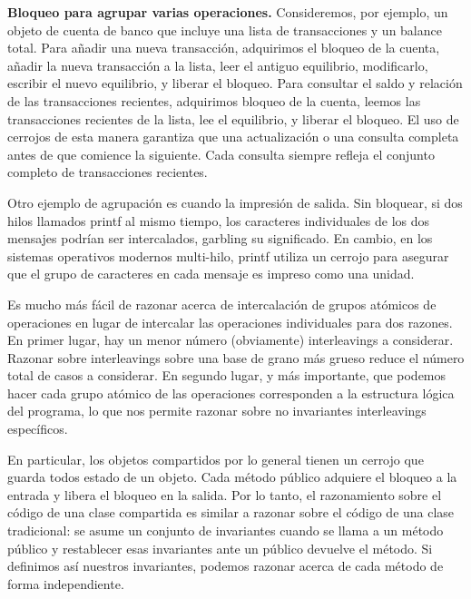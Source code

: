 \documentclass[10pt]{book}
\begin{document}
\textbf{Bloqueo para agrupar varias operaciones.} Consideremos, por ejemplo, un objeto de cuenta de banco que incluye una lista de transacciones y un balance total. Para añadir una nueva transacción, adquirimos el bloqueo de la cuenta, añadir la nueva transacción a la lista, leer el antiguo equilibrio, modificarlo, escribir el nuevo equilibrio, y liberar el bloqueo. Para consultar el saldo y relación de las transacciones recientes, adquirimos bloqueo de la cuenta, leemos las transacciones recientes de la lista, lee el equilibrio, y liberar el bloqueo. El uso de cerrojos de esta manera garantiza que una actualización o una consulta completa antes de que comience la siguiente. Cada consulta siempre refleja el conjunto completo de transacciones recientes.

Otro ejemplo de agrupación es cuando la impresión de salida. Sin bloquear, si dos hilos llamados printf al mismo tiempo, los caracteres individuales de los dos mensajes podrían ser intercalados, garbling su significado. En cambio, en los sistemas operativos modernos multi-hilo, printf utiliza un cerrojo para asegurar que el grupo de caracteres en cada mensaje es impreso como una unidad.

Es mucho más fácil de razonar acerca de intercalación de grupos atómicos de operaciones en lugar de intercalar las operaciones individuales para dos razones. En primer lugar, hay un menor número (obviamente) interleavings a considerar. Razonar sobre interleavings sobre una base de grano más grueso reduce el número total de casos a considerar. En segundo lugar, y más importante, que podemos hacer cada grupo atómico de las operaciones corresponden a la estructura lógica del programa, lo que nos permite razonar sobre no invariantes interleavings específicos.

En particular, los objetos compartidos por lo general tienen un cerrojo que guarda todos estado de un objeto. Cada método público adquiere el bloqueo a la entrada y libera el bloqueo en la salida. Por lo tanto, el razonamiento sobre el código de una clase compartida es similar a razonar sobre el código de una clase tradicional: se asume un conjunto de invariantes cuando se llama a un método público y restablecer esas invariantes ante un público devuelve el método. Si definimos así nuestros invariantes, podemos razonar acerca de cada método de forma independiente.
\end{document}
